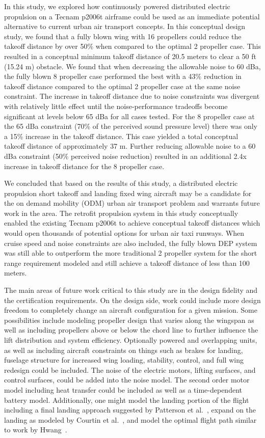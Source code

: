 \documentclass[conf]{new-aiaa}
\begin{document}
In this study, we explored how continuously powered distributed electric propulsion on a Tecnam p2006t airframe could be used as an immediate potential alternative to current urban air transport concepts. In this conceptual design study, we found that a fully blown wing with 16 propellers could reduce the takeoff distance by over 50\% when compared to the optimal 2 propeller case. This resulted in a conceptual minimum takeoff distance of 20.5 meters to clear a 50 ft (15.24 m) obstacle. We found that when decreasing the allowable noise to 60 dBa, the fully blown 8 propeller case performed the best with a 43\% reduction in takeoff distance compared to the optimal 2 propeller case at the same noise constraint. The increase in takeoff distance due to noise constraints was divergent with relatively little effect until the noise-performance tradeoffs become significant at levels below 65 dBa for all cases tested. For the 8 propeller case at the 65 dBa constraint (70\% of the perceived sound pressure level) there was only a 15\% increase in the takeoff distance. This case yielded a total conceptual takeoff distance of approximately 37 m. Further reducing allowable noise to a 60 dBa constraint (50\% perceived noise reduction) resulted in an additional 2.4x increase in takeoff distance for the 8 propeller case.

We concluded that based on the results of this study, a distributed electric propulsion short takeoff and landing fixed wing aircraft may be a candidate for the on demand mobility (ODM) urban air transport problem and warrants future work in the area. The retrofit propulsion system in this study conceptually enabled the existing Tecnam p2006t to achieve conceptual takeoff distances which would open thousands of potential options for urban air taxi runways. When cruise speed and noise constraints are also included, the fully blown DEP system was still able to outperform the more traditional 2 propeller system for the short range requirement modeled and still achieve a takeoff distance of less than 100 meters.

The main areas of future work critical to this study are in the design fidelity and the certification requirements. On the design side, work could include more design freedom to completely change an aircraft configuration for a given mission. Some possibilities include modeling propeller design that varies along the wingspan as well as including propellers above or below the chord line to further influence the lift distribution and system efficiency. Optionally powered and overlapping units, as well as including aircraft constraints on things such as brakes for landing, fuselage structure for increased wing loading, stability, control, and full wing redesign could be included. The noise of the electric motors, lifting surfaces, and control surfaces, could be added into the noise model. The second order motor model including heat transfer could be included as well as a time-dependent battery model. Additionally, one might model the landing portion of the flight including a final landing approach suggested by Patterson et al.~\cite{Patterson:2017aa}, expand on the landing as modeled by Courtin et al.~\cite{Courtin:2018aa}, and model the optimal flight path similar to work by Hwang~\cite{Hwang:2018aa}.
\end{document}
